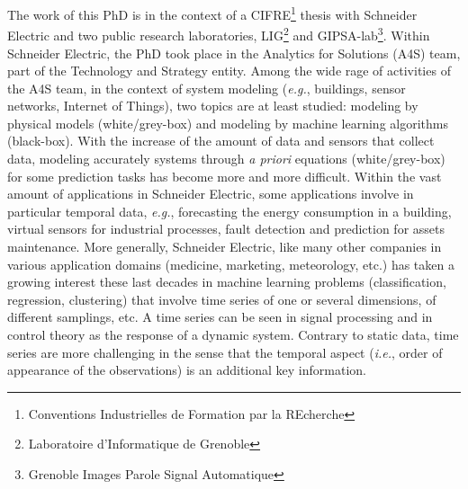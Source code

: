 The work of this PhD is in the context of a CIFRE\footnote[1]{Conventions Industrielles de Formation par la REcherche} thesis with Schneider Electric and two public research laboratories, LIG\footnote[2]{Laboratoire d'Informatique de Grenoble} and GIPSA-lab\footnote[3]{Grenoble Images Parole Signal Automatique}. Within Schneider Electric, the PhD took place in the Analytics for Solutions (A4S) team, part of the Technology and Strategy entity. Among the wide rage of activities of the A4S team, in the context of system modeling (\textit{e.g.}, buildings, sensor networks, Internet of Things), two topics are at least studied: modeling by physical models (white/grey-box) and modeling by machine learning algorithms (black-box). With the increase of the amount of data and sensors that collect data, modeling accurately systems through \textit{a priori} equations (white/grey-box) for some prediction tasks has become more and more difficult. Within the vast amount of applications in Schneider Electric, some applications involve in particular temporal data, \textit{e.g.}, forecasting the energy consumption in a building, virtual sensors for industrial processes, fault detection and prediction for assets maintenance. More generally, Schneider Electric, like many other companies in various application domains (medicine, marketing, meteorology, etc.) has taken a growing interest these last decades in machine learning problems (classification, regression, clustering) that involve time series of one or several dimensions, of different samplings, etc. A time series can be seen in signal processing and in control theory as the response of a dynamic system. Contrary to static data, time series are more challenging in the sense that the temporal aspect (\textit{i.e.}, order of appearance of the observations) is an additional key information. \\

